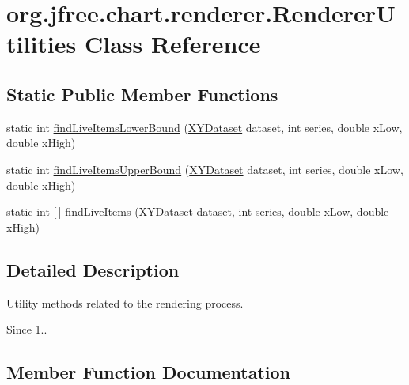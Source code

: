 \hypertarget{classorg_1_1jfree_1_1chart_1_1renderer_1_1_renderer_utilities}{}\section{org.\+jfree.\+chart.\+renderer.\+Renderer\+Utilities Class Reference}
\label{classorg_1_1jfree_1_1chart_1_1renderer_1_1_renderer_utilities}
\subsection*{Static Public Member Functions}
\begin{DoxyCompactItemize}
\item 
static int \mbox{\hyperlink{classorg_1_1jfree_1_1chart_1_1renderer_1_1_renderer_utilities_a5f4babcfcbf8653de17fd78e571e2841}{find\+Live\+Items\+Lower\+Bound}} (\mbox{\hyperlink{interfaceorg_1_1jfree_1_1data_1_1xy_1_1_x_y_dataset}{X\+Y\+Dataset}} dataset, int series, double x\+Low, double x\+High)
\item 
static int \mbox{\hyperlink{classorg_1_1jfree_1_1chart_1_1renderer_1_1_renderer_utilities_a644f6c1daff241b217df12b36c6660e4}{find\+Live\+Items\+Upper\+Bound}} (\mbox{\hyperlink{interfaceorg_1_1jfree_1_1data_1_1xy_1_1_x_y_dataset}{X\+Y\+Dataset}} dataset, int series, double x\+Low, double x\+High)
\item 
static int \mbox{[}$\,$\mbox{]} \mbox{\hyperlink{classorg_1_1jfree_1_1chart_1_1renderer_1_1_renderer_utilities_a47df0e979b7ea6854d2134816c7ba5bd}{find\+Live\+Items}} (\mbox{\hyperlink{interfaceorg_1_1jfree_1_1data_1_1xy_1_1_x_y_dataset}{X\+Y\+Dataset}} dataset, int series, double x\+Low, double x\+High)
\end{DoxyCompactItemize}


\subsection{Detailed Description}
Utility methods related to the rendering process.

\begin{DoxySince}{Since}
1.. 
\end{DoxySince}


\subsection{Member Function Documentation}
\mbox{\label{classorg_1_1jfree_1_1chart_1_1renderer_1_1_renderer_utilities_a47df0e979b7ea6854d2134816c7ba5bd}} 
